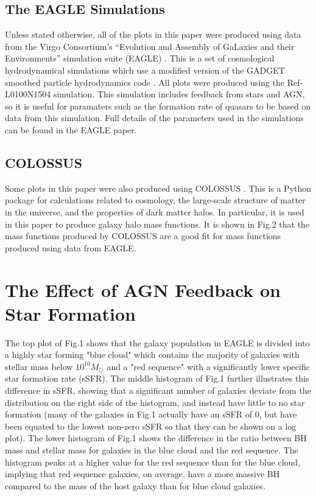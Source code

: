 \documentclass[12pt, twocolumn]{revtex4}    %
\begin{document}
\subsection{The EAGLE Simulations}

Unless stated otherwise, all of the plots in this paper were produced using data from the Virgo Consortium’s “Evolution and Assembly of GaLaxies and their Environments” simulation suite (EAGLE) \cite{EAGLE}. This is a set of cosmological hydrodynamical simulations which use a modified version of the GADGET smoothed particle hydrodynamics code \cite{GADGET}. All plots were produced using the Ref-L0100N1504 simulation. This simulation includes feedback from stars and AGN, so it is useful for paramaters such as the formation rate of quasars to be based on data from this simulation. Full details of the parameters used in the simulations can be found in the EAGLE paper.

\subsection{COLOSSUS}

Some plots in this paper were also produced using COLOSSUS \cite{COLOSSUS}. This is a Python package for calculations related to cosmology, the large-scale structure of matter in the universe, and the properties of dark matter halos. In particular, it is used in this paper to produce galaxy halo mass functions. It is shown in Fig.2 that the mass functions produced by COLOSSUS are a good fit for mass functions produced using data from EAGLE.

\section{The Effect of AGN Feedback on Star Formation}

The top plot of Fig.1 shows that the galaxy population in EAGLE is divided into a highly star forming "blue cloud" which contains the majority of galaxies with stellar mass below $10^{10}M_\odot$ and a "red sequence" with a significantly lower specific star formation rate (sSFR). The middle histogram of Fig.1 further illustrates this difference in sSFR, showing that a significant number of galaxies deviate from the distribution on the right side of the histogram, and instead have little to no star formation (many of the galaxies in Fig.1 actually have an sSFR of 0, but have been equated to the lowest non-zero sSFR so that they can be shown on a log plot). The lower histogram of Fig.1 shows the difference in the ratio between BH mass and stellar mass for galaxies in the blue cloud and the red sequence. The histogram peaks at a higher value for the red sequence than for the blue cloud, implying that red sequence galaxies, on average, have a more massive BH compared to the mass of the host galaxy than for blue cloud galaxies.\par
\end{document}
